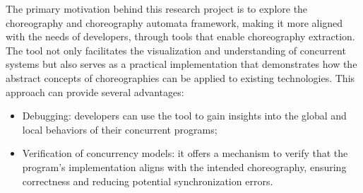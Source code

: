 The primary motivation behind this research project is to explore the choreography and choreography automata framework, making it more aligned with the needs of developers, through tools that enable choreography extraction. The tool not only facilitates the visualization and understanding of concurrent systems but also serves as a practical implementation that demonstrates how the abstract concepts of choreographies can be applied to existing technologies. This approach can provide several advantages:
\begin{itemize}
    \item Debugging: developers can use the tool to gain insights into the global and local behaviors of their concurrent programs;
    \item Verification of concurrency models: it offers a mechanism to verify that the program's implementation aligns with the intended choreography, ensuring correctness and reducing potential synchronization errors.
\end{itemize}